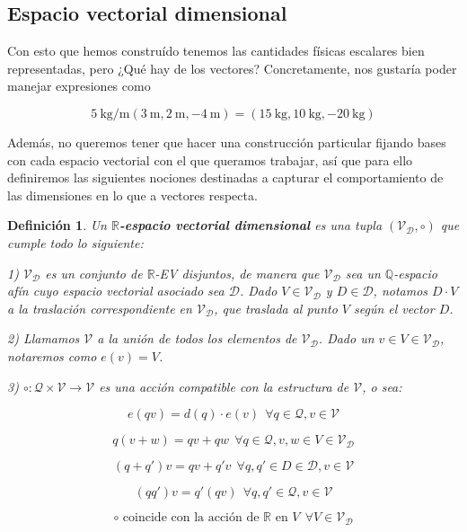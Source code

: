 \documentclass{article}
\def\Dimensions{\mathcal D}
\def\Quantities{\mathcal Q}
\newtheorem{definicion}{{\sc Definición}}
\begin{document}
\subsection{Espacio vectorial dimensional}

Con esto que hemos construído tenemos las cantidades físicas escalares bien representadas,
pero ¿Qué hay de los vectores? Concretamente, nos gustaría
poder manejar expresiones como

$$\SI{5}{\kilogram \per \meter} (\SI{3}{\meter}, \SI{2}{\meter}, \SI{-4}{\meter} ) = (\SI{15}{\kilogram}, \SI{10}{\kilogram}, \SI{-20}{\kilogram} )$$

Además, no queremos tener que hacer una construcción particular fijando bases con cada espacio vectorial con el que queramos trabajar, así que para
ello definiremos las siguientes nociones destinadas a capturar el comportamiento de las dimensiones en lo que a vectores respecta.

\begin{definicion}
Un \textbf{$\mathbb{R}$-espacio vectorial dimensional} es una tupla $(\mathcal{V_D}, \circ)$ que cumple todo lo siguiente:

1) $\mathcal{V_D}$ es un conjunto de $\mathbb{R}$-EV disjuntos, de manera que $\mathcal{V_D}$ sea un $\mathbb{Q}$-espacio afín cuyo espacio vectorial asociado sea $\Dimensions$.
     Dado $V \in \mathcal{V_D}$ y $D \in \Dimensions$, notamos $D \cdot V$ a la traslación correspondiente en $\mathcal{V_D}$, que traslada al punto $V$ según el vector $D$.

2) Llamamos $\mathcal{V}$ a la unión de todos los elementos de $\mathcal{V_D}$. Dado un $v \in V \in \mathcal{V_D}$, notaremos como
$e(v) = V$.

3) $\circ : \Quantities \times \mathcal{V} \rightarrow \mathcal{V}$ es una acción compatible con la estructura de $\mathcal{V}$, o sea:

   $$ e(qv) = d(q) \cdot e(v) \ \ \forall q \in \Quantities, v \in \mathcal{V} $$

   $$ q(v+w) = qv + qw  \ \ \forall q \in \Quantities, v,w \in V \in \mathcal{V_D}$$
   
   $$ (q+q')v = qv + q'v  \ \ \forall q,q' \in D \in \Dimensions, v \in \mathcal{V}$$
   
   $$ (qq')v = q'(qv)  \ \ \forall q,q' \in \Quantities, v \in \mathcal{V}$$

   $$ \circ \mbox { coincide con la acción de } \mathbb{R} \mbox{ en } V \ \ \forall V \in \mathcal{V_D}$$

\end{definicion}
\end{document}
